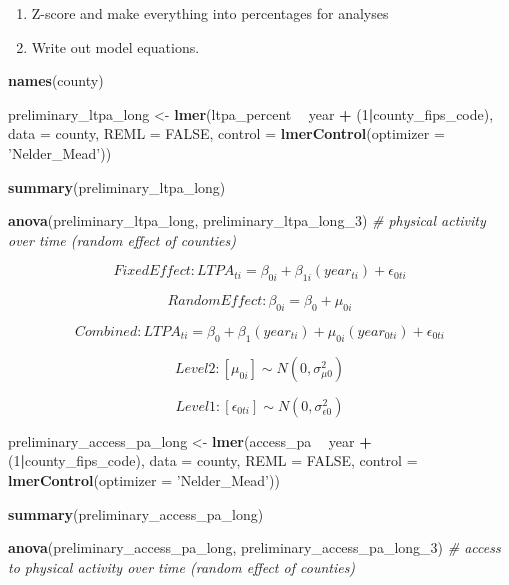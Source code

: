 \documentclass[
]{article}
\newenvironment{Shaded}{\begin{snugshade}}{\end{snugshade}}
\newcommand{\CommentTok}[1]{\textcolor[rgb]{0.56,0.35,0.01}{\textit{#1}}}
\newcommand{\DataTypeTok}[1]{\textcolor[rgb]{0.13,0.29,0.53}{#1}}
\newcommand{\DecValTok}[1]{\textcolor[rgb]{0.00,0.00,0.81}{#1}}
\newcommand{\KeywordTok}[1]{\textcolor[rgb]{0.13,0.29,0.53}{\textbf{#1}}}
\newcommand{\NormalTok}[1]{#1}
\newcommand{\OperatorTok}[1]{\textcolor[rgb]{0.81,0.36,0.00}{\textbf{#1}}}
\newcommand{\OtherTok}[1]{\textcolor[rgb]{0.56,0.35,0.01}{#1}}
\newcommand{\StringTok}[1]{\textcolor[rgb]{0.31,0.60,0.02}{#1}}
\begin{document}
\begin{enumerate}
\def\labelenumi{\arabic{enumi}.}
\setcounter{enumi}{2}
\item
  Z-score and make everything into percentages for analyses
\item
  Write out model equations.
\end{enumerate}

\begin{Shaded}
\begin{Highlighting}[]
\KeywordTok{names}\NormalTok{(county)}

\NormalTok{preliminary_ltpa_long <-}\StringTok{ }\KeywordTok{lmer}\NormalTok{(ltpa_percent }\OperatorTok{~}\StringTok{ }\NormalTok{year }\OperatorTok{+}\StringTok{ }\NormalTok{(}\DecValTok{1}\OperatorTok{|}\NormalTok{county_fips_code), }
                       \DataTypeTok{data =}\NormalTok{ county,}
                       \DataTypeTok{REML =} \OtherTok{FALSE}\NormalTok{,}
                    \DataTypeTok{control =} \KeywordTok{lmerControl}\NormalTok{(}\DataTypeTok{optimizer =} \StringTok{'Nelder_Mead'}\NormalTok{))}

\KeywordTok{summary}\NormalTok{(preliminary_ltpa_long)}

\KeywordTok{anova}\NormalTok{(preliminary_ltpa_long, preliminary_ltpa_long_}\DecValTok{3}\NormalTok{)}
\CommentTok{# physical activity over time (random effect of counties)}
\end{Highlighting}
\end{Shaded}

\[ Fixed Effect: LTPA_{ti} = \beta_{0i} + \beta_{1i}(year_{ti}) + \epsilon_{0ti} \]

\[ Random Effect: \beta_{0i} = \beta_0 + \mu_{0i}  \]

\[ Combined: LTPA_{ti} = \beta_0 + \beta_{1}(year_{ti}) + \mu_{0i}(year_{0ti}) + \epsilon_{0ti} \]

\[ Level 2: [\mu_{0i}] \sim N(0, \sigma^2_{\mu0}) \]

\[ Level 1: [\epsilon_{0ti}] \sim N(0,\sigma^2_{\epsilon0}) \]

\begin{Shaded}
\begin{Highlighting}[]
\NormalTok{preliminary_access_pa_long <-}\StringTok{ }\KeywordTok{lmer}\NormalTok{(access_pa }\OperatorTok{~}\StringTok{ }\NormalTok{year }\OperatorTok{+}\StringTok{ }\NormalTok{(}\DecValTok{1}\OperatorTok{|}\NormalTok{county_fips_code), }
                       \DataTypeTok{data =}\NormalTok{ county,}
                       \DataTypeTok{REML =} \OtherTok{FALSE}\NormalTok{,}
                    \DataTypeTok{control =} \KeywordTok{lmerControl}\NormalTok{(}\DataTypeTok{optimizer =} \StringTok{'Nelder_Mead'}\NormalTok{))}

\KeywordTok{summary}\NormalTok{(preliminary_access_pa_long)}

\KeywordTok{anova}\NormalTok{(preliminary_access_pa_long, preliminary_access_pa_long_}\DecValTok{3}\NormalTok{)}
\CommentTok{# access to physical activity over time (random effect of counties)}
\end{Highlighting}
\end{Shaded}
\end{document}
